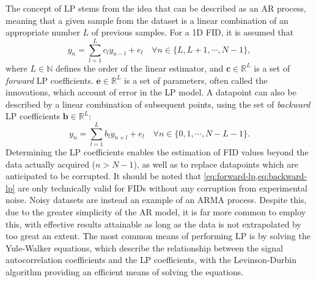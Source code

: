 The concept of \ac{LP} stems from the idea that  can be described as
an \ac{AR} process, meaning that a given sample from the dataset is a linear
combination of an appropriate number $L$ of previous samples. For a \ac{1D}
\ac{FID}, it is assumed that
\begin{equation}
    y_n = \sum_{l=1}^{L}
    c_l y_{n-l} + e_l \quad
    \forall n \in \lbrace L, L + 1, \cdots, N - 1 \rbrace,
    \label{eq:forward-lp}
\end{equation}
where $L \in
\mathbb{N}$ defines the order of the linear estimator, and $\symbf{c} \in
\mathbb{R}^{L}$ is a set of \emph{forward} \ac{LP} coefficients. $\symbf{e} \in
\mathbb{R}^L$ is a set of parameters, often called the innovations,
which account of error in the \ac{LP} model. A datapoint can also be described
by a linear combination of subsequent points, using the set of \emph{backward}
\ac{LP} coefficients $\symbf{b} \in \mathbb{R}^L$:
\begin{equation}
    y_n = \sum_{l=1}^{L}
    b_l y_{n+l} + e_l \quad
    \forall n \in \lbrace 0, 1, \cdots, N - L - 1 \rbrace.
    \label{eq:backward-lp}
\end{equation}
Determining
the \ac{LP} coefficients enables the estimation of \ac{FID} values beyond the
data actually acquired ($n > N - 1$), as well as to replace
datapoints which are anticipated to be corrupted. It should be noted that
\cref{eq:forward-lp,eq:backward-lp} are only technically valid for
\acp{FID} without any corruption from experimental noise. Noisy datasets are
instead an example of an \ac{ARMA} process. Despite this, due to the greater
simplicity of the \ac{AR} model, it is far more common to employ this, with
effective results attainable as long as the data is not extrapolated by too
great an extent. The most common means of performing \ac{LP} is by solving the
Yule-Walker equations\cite{Yule1927,Walker1931}, which describe the
relationship between the signal autocorrelation coefficients and the \ac{LP}
coefficients\cite[Section 3.3]{Koehl1999}, with the Levinson-Durbin algorithm
providing an efficient means of solving the
equations\cite{Levinson1946,Durbin1960}.

